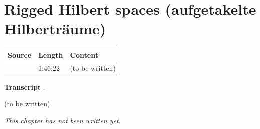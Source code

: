 \chapter{Rigged Hilbert spaces (aufgetakelte Hilberträume)}\label{ch:c08}
\begin{paracol}{2}

\begin{sources}
\begin{tabularx}{\linewidth}{@{}l l L@{}}
\toprule
\textbf{Source} & \textbf{Length} & \textbf{Content}\\
\midrule
{} & 1:46:22 & (to be written)\\
\bottomrule
\end{tabularx}

\smallskip
\textbf{Transcript} .
\end{sources}

\begin{reading}
(to be written)
\end{reading}

\emph{This chapter has not been written yet.}

\flushside
\end{paracol}
